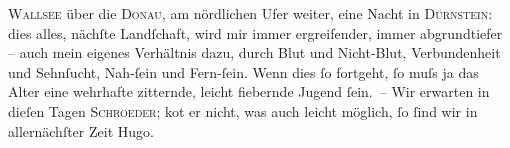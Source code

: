\begin{ledgroupsized}[t]{13cm}
                  \textsc{Wallsee} über die \textsc{Donau}, am nördlichen Ufer weiter, eine Nacht in \textsc{Dürnstein}: dies alles, nächſte Landſchaft, wird mir immer ergreifender, immer
               abgrundtiefer – auch mein eigenes Verhältnis dazu, durch Blut und Nicht-Blut,
               Verbundenheit und Sehnſucht, Nah-ſein und Fern-ſein. Wenn dies ſo fortgeht, ſo muſs
               ja das Alter eine wehrhafte zitternde, leicht fiebernde Jugend ſein. – Wir erwarten in
               dieſen Tagen \textsc{Schroeder}; ko{\geminationm}t er nicht, was auch leicht möglich, ſo ſind
               wir in allernächſter Zeit \label{T_L02176_1v}\label{T_L02176_1h}\pend
           \pstart \spacefill\mbox{Hugo.}\pend{}\endnumbering{}\end{ledgroupsized}  \newcommand{\dateiname}{L02176}\newcommand{\titel}{Hugo von Hofmannsthal an Arthur Schnitzler, 16. 4. [1914]}\newcommand{\editorInnen}{Martin Anton Müller und Gerd-Hermann Susen}
      